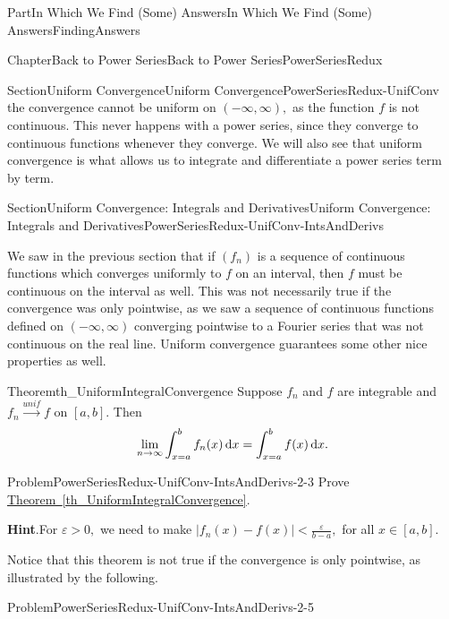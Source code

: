 \documentclass[oneside,10pt,]{book}
\newcommand{\blocktitlefont}{\relax}
\newcommand{\xreffont}{\relax}
\numberwithin{equation}{part}
\newcommand{\dx}[1]{\,{\rm d}#1}
\newcommand{\eps}{\varepsilon}
\newcommand{\unif}{\stackrel{unif}{\longrightarrow}}
\newcommand{\lt}{<}
\begin{document}
\begin{partptx}{Part}{In Which We Find (Some) Answers}{}{In Which We Find (Some) Answers}{}{}{FindingAnswers}
\begin{chapterptx}{Chapter}{Back to Power Series}{}{Back to Power Series}{}{}{PowerSeriesRedux}
\begin{sectionptx}{Section}{Uniform Convergence}{}{Uniform Convergence}{}{}{PowerSeriesRedux-UnifConv}
the convergence cannot be uniform on \((-\infty,\infty),\) as the function \(f\) is not continuous.  This never happens with a power series, since they converge to continuous functions whenever they converge.  We will also see that uniform convergence is what allows us to integrate and differentiate a power series term by term.%
\end{sectionptx}
%
%
\typeout{************************************************}
\typeout{************************************************}
%
\begin{sectionptx}{Section}{Uniform Convergence: Integrals and Derivatives}{}{Uniform Convergence: Integrals and Derivatives}{}{}{PowerSeriesRedux-UnifConv-IntsAndDerivs}
\begin{introduction}{}%
We saw in the previous section that if \(\left(f_n\right)\) is a sequence of continuous functions which converges uniformly to \(f\) on an interval, then \(f\) must be continuous on the interval as well.  This was not necessarily true if the convergence was only pointwise, as we saw a sequence of continuous functions defined on \((-\infty,\infty)\) converging pointwise to a Fourier series that was not continuous on the real line.  Uniform convergence guarantees some other nice properties as well.%
\begin{theorem}{Theorem}{}{}{th_UniformIntegralConvergence}%
 Suppose \(f_n\) and \(f\) are integrable and \(f_n\unif f\) on \([a,b]\).  Then%
\begin{equation*}
\lim_{n\rightarrow\infty}\int_{x=a}^b f_n(x)\dx{ x}=\int_{x=a}^bf(x)\dx{x}\text{.}
\end{equation*}
%
\end{theorem}
\begin{problem}{Problem}{}{PowerSeriesRedux-UnifConv-IntsAndDerivs-2-3}%
 Prove \hyperref[th_UniformIntegralConvergence]{Theorem~{\xreffont\ref{th_UniformIntegralConvergence}}}.%
\par\smallskip%
\noindent\textbf{\blocktitlefont Hint}.\hypertarget{PowerSeriesRedux-UnifConv-IntsAndDerivs-2-3-2}{}\quad{}For \(\eps>0,\) we need to make \(|f_n(x)-f(x)|\lt
\frac{\eps}{b-a},\) for all \(x\in[a,b]\).%
\end{problem}
Notice that this theorem is not true if the convergence is only pointwise, as illustrated by the following.%
\begin{problem}{Problem}{}{PowerSeriesRedux-UnifConv-IntsAndDerivs-2-5}%

\end{problem}
\end{introduction}
\end{sectionptx}
\end{chapterptx}
\end{partptx}
\end{document}
